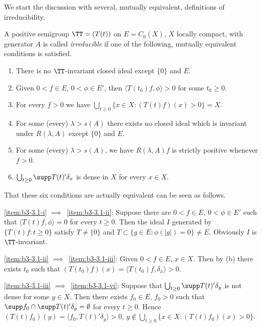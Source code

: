 We start the discussion with several, mutually equivalent, definitions of irreducibility. 
\begin{definition}\label{def:b3-3.1}
A positive semigroup $\TT = (T(t))$ on $E = C_{0}(X)$, $X$ locally compact, with generator $A$ is called \emph{irreducible} if one of the following, mutually equivalent conditions is satisfied.
\begin{enumerate}[\upshape (a)]

\item\label{item:b3-3.1-i}
There is no $\TT$-invariant closed ideal except $\{0\}$ and $E$.
	
\item\label{item:b3-3.1-ii}
Given $0 < f \in E$, $0 < \phi \in E'$, then $\langle T(t_{0})f,\phi \rangle > 0$ for some $t_{0} \geq 0$.
	
\item\label{item:b3-3.1-iii}
For every $f > 0$ we have 
$\bigcup_{t \geq 0}\{x \in X \colon (T(t)f)(x) > 0\} = X$.
	
\item\label{item:b3-3.1-iv}
For some (every) $\lambda > s(A)$ there exists no closed ideal which is invariant under $R(\lambda,A)$ except $\{0\}$ and $E$.
	
\item\label{item:b3-3.1-v}
For some (every) $\lambda > s(A)$, we have $R(\lambda,A)f$ is strictly positive whenever $f > 0$.
	
\item\label{item:b3-3.1-vi}
$\bigcup_{t \geq 0}\supp T(t)'\delta_{x}$ is dense in $X$ for every $x \in X$.

\end{enumerate}
\end{definition}
That these six conditions are actually equivalent can be seen as follows.

\ref{item:b3-3.1-i} $\implies$~\ref{item:b3-3.1-ii}: Suppose there are $0 < f \in E$, $0 < \phi \in E'$ such that $\langle T(t)f,\phi \rangle = 0$ for every $t \geq 0$.
Then the ideal $I$ generated by $\{T(t)f \colon t \geq 0\}$ satisfy $T \neq \{0\}$  and  $T \subset \{g \in E \colon \phi(|g|) = 0\} \neq E$.
Obviously $I$ is $\TT$-invariant.

\ref{item:b3-3.1-ii} $\implies$~\ref{item:b3-3.1-iii}: Given $0 < f \in E$, $x \in X$.
Then by (b) there exists $t_{0}$ such that $(T(t_{0})f)(x) = \langle T(t_{0})f,\delta_{x} \rangle > 0$.

\ref{item:b3-3.1-iii} $\implies$~\ref{item:b3-3.1-vi}: Suppose that $\bigcup_{t \geq 0}\supp T(t)'\delta_{y}$ is not dense for some $y \in X$.
Then there exists $f_{0} \in E$, $f_{0} > 0$ such that
$\supp f_{0} \cap \supp T(t)'\delta_{y} = \emptyset$ for every $t \geq 0$.
Hence $(T(t)f_{0})(y) = \langle f_{0},T(t)'\delta_{y} \rangle > 0$, \ie $y \notin \bigcup_{t\geq 0}\{x \in X \colon (T(t)f_{0})(x) > 0\}$.

